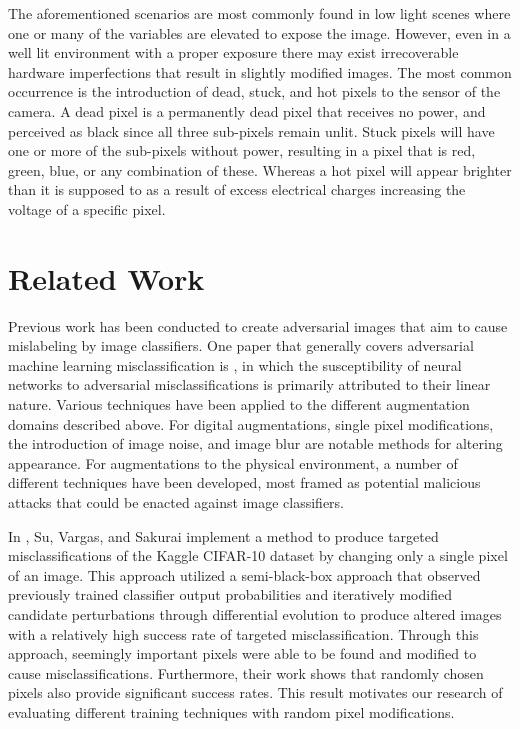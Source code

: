 \documentclass[conference]{IEEEtran}
\begin{document}
The aforementioned scenarios are most commonly found in low light scenes where one or many of the variables are elevated to expose the image. However, even in a well lit environment with a proper exposure there may exist irrecoverable hardware imperfections that result in slightly modified images. The most common occurrence is the introduction of dead, stuck, and hot pixels to the sensor of the camera. A dead pixel is a permanently dead pixel that receives no power, and perceived as black since all three sub-pixels remain unlit. Stuck pixels will have one or more of the sub-pixels without power, resulting in a pixel that is red, green, blue, or any combination of these. Whereas a hot pixel will appear brighter than it is supposed to as a result of excess electrical charges increasing the voltage of a specific pixel.

\section{Related Work}

Previous work has been conducted to create adversarial images that aim to cause mislabeling by image classifiers. One paper that generally covers adversarial machine learning misclassification is \cite{goodfellowadversarial}, in which the susceptibility of neural networks to adversarial misclassifications is primarily attributed to their linear nature. Various techniques have been applied to the different augmentation domains described above. For digital augmentations, single pixel modifications, the introduction of image noise, and image blur are notable methods for altering appearance. For augmentations to the physical environment, a number of different techniques have been developed, most framed as potential malicious attacks that could be enacted against image classifiers.

In \cite{onepixelfoolingdnn}, Su, Vargas, and Sakurai implement a method to produce targeted misclassifications of the Kaggle CIFAR-10 dataset by changing only a single pixel of an image. This approach utilized a semi-black-box approach that observed previously trained classifier output probabilities and iteratively modified candidate perturbations through differential evolution to produce altered images with a relatively high success rate of targeted misclassification. Through this approach, seemingly important pixels were able to be found and modified to cause misclassifications. Furthermore, their work shows that randomly chosen pixels also provide significant success rates. This result motivates our research of evaluating different training techniques with random pixel modifications.
\end{document}
